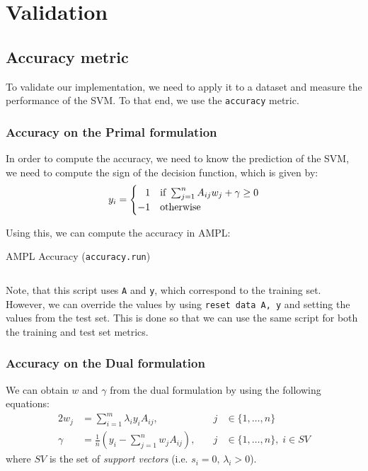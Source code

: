\chapter{Validation}

\section{Accuracy metric}

To validate our implementation, we
need to apply it to a dataset and measure
the performance of the SVM. To that end,
we use the \texttt{accuracy} metric.

\subsection{Accuracy on the Primal formulation}

In order to compute the accuracy, we
need to know the prediction of the SVM, we
need to compute the sign of the decision
function, which is given by:
\begin{equation*}
	\label{eq:categories}
	y_i = \begin{cases}
        \hphantom{-}1 & \text{if } \sum_{j=1}^n A_{ij} w_j + \gamma \geq 0 \\
		-1 & \text{otherwise}
	\end{cases}
\end{equation*}

Using this, we can compute the accuracy in AMPL:
\begin{listing}[H]
	\caption{AMPL Accuracy (\texttt{accuracy.run})}
    \inputminted{ampl}{../ampl/accuracy.run}
\end{listing}

Note, that this script uses \texttt{A} and \texttt{y}, which
correspond to the training set. However, we can override
the values by using \texttt{reset data A, y}
and setting the values from the test set. This is done so
that we can use the same script for both the training and
test set metrics.

\subsection{Accuracy on the Dual formulation}%
\label{sec:accuracy-dual}

We can obtain $w$ and $\gamma$ from the dual formulation
by using the following equations:
\begin{alignat*}{2}
    w_j &= \sum_{i=1}^m \lambda_i y_i A_{ij},&\quad j &\in \{1,\ldots,n\} \\
    \gamma &= \frac{1}{n}\left(y_i - \sum_{j=1}^{n} w_j A_{ij}\right),&\quad j &\in \{1,\ldots,n\},\;i \in SV
\end{alignat*}
where $SV$ is the set of \emph{support vectors} (i.e. $s_i = 0,\, \lambda_i > 0$).

